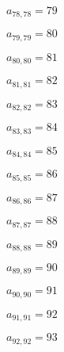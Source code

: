 \documentclass[a4paper,12pt]{article}
\begin{document}
$a _{ 78, 78 } = 79$

$a _{ 79, 79 } = 80$

$a _{ 80, 80 } = 81$

$a _{ 81, 81 } = 82$

$a _{ 82, 82 } = 83$

$a _{ 83, 83 } = 84$

$a _{ 84, 84 } = 85$

$a _{ 85, 85 } = 86$

$a _{ 86, 86 } = 87$

$a _{ 87, 87 } = 88$

$a _{ 88, 88 } = 89$

$a _{ 89, 89 } = 90$

$a _{ 90, 90 } = 91$

$a _{ 91, 91 } = 92$

$a _{ 92, 92 } = 93$
\end{document}
